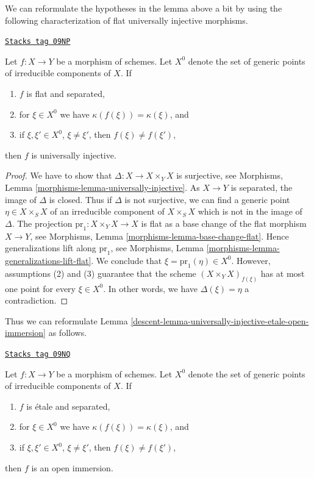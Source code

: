We can reformulate the hypotheses in the lemma above a bit by using the
following characterization of flat universally injective morphisms.

\begin{lemma}
\label{descent-lemma-flat-universally-injective}
\href{https://stacks.math.columbia.edu/tag/09NP}{\texttt{Stacks tag 09NP}}

Let $f : X \to Y$ be a morphism of schemes. Let $X^0$ denote the set
of generic points of irreducible components of $X$. If
\begin{enumerate}
\item $f$ is flat and separated,
\item for $\xi \in X^0$ we have $\kappa(f(\xi)) = \kappa(\xi)$, and
\item if $\xi, \xi' \in X^0$, $\xi \not = \xi'$, then $f(\xi) \not = f(\xi')$,
\end{enumerate}
then $f$ is universally injective.
\end{lemma}

\begin{proof}
We have to show that $\Delta : X \to X \times_Y X$ is surjective, see
Morphisms, Lemma \ref{morphisms-lemma-universally-injective}.
As $X \to Y$ is separated, the image of $\Delta$ is closed.
Thus if $\Delta$ is not surjective, we can find a generic point
$\eta \in X \times_S X$ of an irreducible component of $X \times_S X$
which is not in the image of $\Delta$. The projection
$\text{pr}_1 : X \times_Y X \to X$
is flat as a base change of the flat morphism $X \to Y$, see
Morphisms, Lemma \ref{morphisms-lemma-base-change-flat}.
Hence generalizations lift along $\text{pr}_1$, see
Morphisms, Lemma \ref{morphisms-lemma-generalizations-lift-flat}.
We conclude that $\xi = \text{pr}_1(\eta) \in X^0$.
However, assumptions (2) and (3) guarantee that the scheme
$(X \times_Y X)_{f(\xi)}$ has at most one point for every $\xi \in X^0$.
In other words, we have $\Delta(\xi) = \eta$ a contradiction.
\end{proof}

Thus we can reformulate
Lemma \ref{descent-lemma-universally-injective-etale-open-immersion} as follows.

\begin{lemma}
\label{descent-lemma-characterize-open-immersion}
\href{https://stacks.math.columbia.edu/tag/09NQ}{\texttt{Stacks tag 09NQ}}

Let $f : X \to Y$ be a morphism of schemes. Let $X^0$ denote the set
of generic points of irreducible components of $X$. If
\begin{enumerate}
\item $f$ is \'etale and separated,
\item for $\xi \in X^0$ we have $\kappa(f(\xi)) = \kappa(\xi)$, and
\item if $\xi, \xi' \in X^0$, $\xi \not = \xi'$, then $f(\xi) \not = f(\xi')$,
\end{enumerate}
then $f$ is an open immersion.
\end{lemma}

